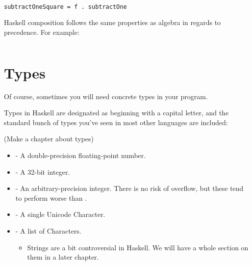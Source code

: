 \begin{verbatim}

subtractOneSquare = f . subtractOne

\end{verbatim}

Haskell composition follows the same properties as algebra in regards to precedence.  For example: 

\begin{verbatim}
\end{verbatim}



\section{Types}
Of course, sometimes you will need concrete types in your program.  

Types in Haskell are designated as beginning with a capital letter, and the standard bunch of types you've seen in most other languages are included: 

(Make a chapter about types)
\begin{itemize}
\item {} - A double-precision floating-point number. 
\item {} - A 32-bit integer. 
\item {} - An arbitrary-precision integer.  There is no risk of overflow, but these tend to perform worse than . 
\item {} - A single Unicode Character. 
\item {} - A list of Characters. \begin{itemize}
            \item Strings are a bit controversial in Haskell.  We will have a whole section on them in a later chapter. 
	\end{itemize}
\end{itemize}

